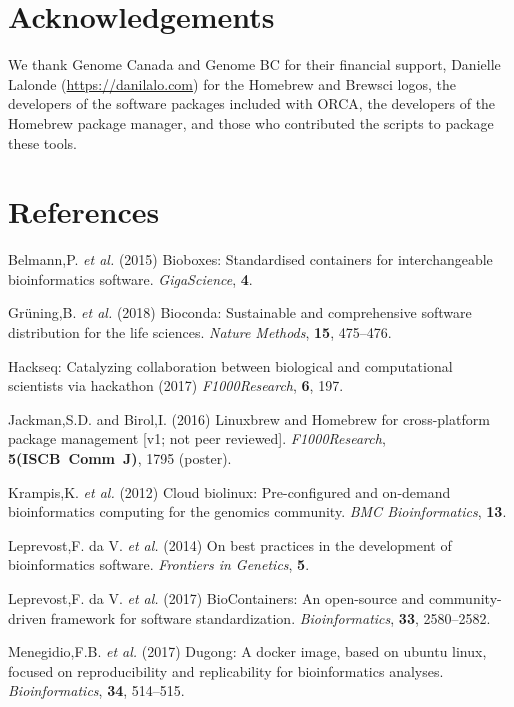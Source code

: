 \documentclass{bioinfo}
\begin{document}
\section*{Acknowledgements}

We thank Genome Canada and Genome BC for their financial support, Danielle Lalonde (\url{https://danilalo.com}) for the Homebrew and Brewsci logos, the developers of the software packages included with ORCA, the developers of the Homebrew package manager, and those who contributed the scripts to package these tools.

\section*{References}

\begin{list}{}{
\setlength{\leftmargin}{4mm}
\setlength{\itemindent}{-4mm}
}
\small
\item Belmann,P. \emph{et al.} (2015) Bioboxes: Standardised containers for interchangeable bioinformatics software. \emph{GigaScience}, \textbf{4}.
\item Gr\"uning,B. \emph{et al.} (2018) Bioconda: Sustainable and comprehensive software distribution for the life sciences. \emph{Nature Methods}, \textbf{15}, 475--476.
\item Hackseq: Catalyzing collaboration between biological and computational scientists via hackathon (2017) \emph{F1000Research}, \textbf{6}, 197.
\item Jackman,S.D. and Birol,I. (2016) Linuxbrew and Homebrew for cross-platform package management {[}v1; not peer reviewed{]}. \emph{F1000Research}, \textbf{5(ISCB~Comm~J)}, 1795 (poster).
\item Krampis,K. \emph{et al.} (2012) Cloud biolinux: Pre-configured and on-demand bioinformatics computing for the genomics community. \emph{BMC Bioinformatics}, \textbf{13}.
\item Leprevost,F. da V. \emph{et al.} (2014) On best practices in the development of bioinformatics software. \emph{Frontiers in Genetics}, \textbf{5}.
\item Leprevost,F. da V. \emph{et al.} (2017) BioContainers: An open-source and community-driven framework for software standardization. \emph{Bioinformatics}, \textbf{33}, 2580--2582.
\item Menegidio,F.B. \emph{et al.} (2017) Dugong: A docker image, based on ubuntu linux, focused on reproducibility and replicability for bioinformatics analyses. \emph{Bioinformatics}, \textbf{34}, 514--515.
\item
\end{list}
\end{document}
